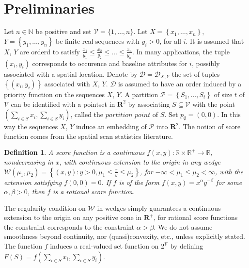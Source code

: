 \documentclass{article}
\newtheorem{definition}{Definition}
\theoremstyle{case}
\begin{document}
\sloppy

\begin{abstract} 
	[REVISE-OUTDATED] We consider....\end{abstract}

\section{Preliminaries}
Let $n \in \mathbb{N}$ be positive and set $\mathcal{V} = \{1, \dots, n\}$. Let $X = \left\lbrace x_1, \dots, x_n\right\rbrace$, $Y = \left\lbrace y_1, \dots, y_n\right\rbrace$ be finite real sequences with $y_i > 0$, for all $i$. 
It is assumed that $X$, $Y$ are orderd to satisfy $\frac{x_1}{y_1} \leq \frac{x_2}{y_2} \leq \dots \leq \frac{x_n}{y_n}$. In many applications, the tuple $(x_i, y_i)$ corresponds to occurence and baseline attributes for $i$, possibly associated with a spatial location. Denote by $\mathcal{D} = \mathcal{D}_{X,Y}$ the set of tuples $\left\lbrace \left( x_i, y_i\right) \right\rbrace$ associated with $X$, $Y$. $\mathcal{D}$ is assumed to have an order induced by a priority function on the sequences $X$, $Y$. A partition $\mathcal{P} = \left\lbrace S_1, \dots, S_t\right\rbrace$ of size $t$ of $\mathcal{V}$ can be identified with a pointset in $\mathbf{R}^2$ by associating $S \subseteq \mathcal{V}$ with the point $(\sum_{i \in S}x_i, \sum_{i \in S}y_i)$, called the $\textit{partition point}$ of $S$. Set $p_{\emptyset} = (0,0)$. In this way the sequences $X$, $Y$ induce an embedding of $\mathcal{P}$ into $\mathbf{R}^2$. The notion of score function comes from the spatial scan statistics literature.

\begin{definition}
A score function is a continuous $f(x, y)\colon \mathbb{R} \times \mathbb{R}^{+} \to \mathbb{R}$, nondecreasing in $x$, with continuous extension to the origin in any wedge $\mathcal{W}\left(\mu_1,\mu_2\right) = \left\lbrace (x,y) : y > 0, \mu_1 \leq \frac{x}{y} \leq \mu_2 \right\rbrace$, for $-\infty < \mu_1 \leq \mu_2 < \infty$, with the extension satisfying $f(0,0) = 0$. If $f$ is of the form $f(x,y) = x^\alpha y^{-\beta}$ for some $\alpha, \beta > 0$, then $f$ is a rational score function. 
\end{definition}

The regularity condition on $\mathcal{W}$ in wedges simply guarantees a continuous extension to the origin on any positive cone in $\mathbf{R}^+$, for rational score functions the constraint corresponds to the constraint $\alpha > \beta$. We do not assume smoothness beyond continuity, nor (quasi)convexity, etc., unless explicitly stated. The function $f$ induces a real-valued set function on $2^{\mathcal{V}}$ by defining $F(S) = f(\sum_{i \in S}x_i, \sum_{i \in S}y_i)$.  
\end{document}
